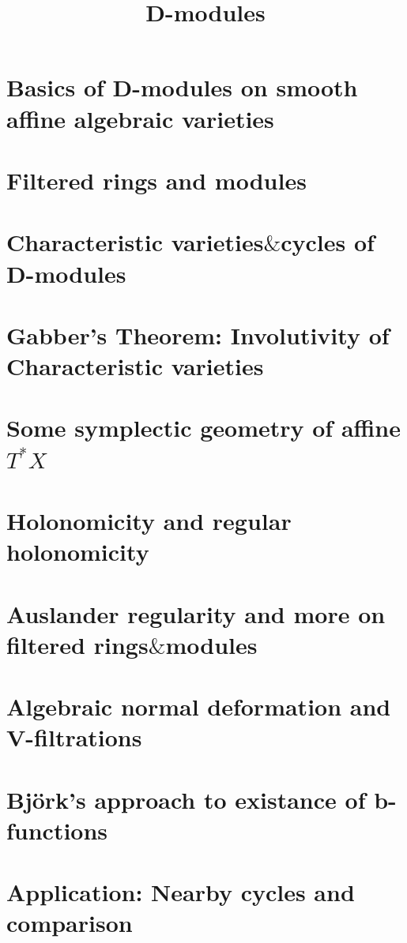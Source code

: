 \documentclass{book}
\title{D-modules}
\numberwithin{equation}{section}
\theoremstyle{thmdot}
\theoremstyle{defdot}
\begin{document}
\maketitle
\tableofcontents

\chapter{Basics of D-modules on smooth affine algebraic varieties}

\chapter{Filtered rings and modules}

\chapter{Characteristic varieties$\&$cycles of D-modules}

\chapter{Gabber's Theorem: Involutivity of Characteristic varieties}

\chapter{Some symplectic geometry of affine $T^{\ast}X$}

\chapter{Holonomicity and regular holonomicity}

\chapter{Auslander regularity and more on filtered rings$\&$modules}

\chapter{Algebraic normal deformation and V-filtrations}

\chapter{Bj\"ork's approach to existance of b-functions}

\chapter{Application: Nearby cycles and comparison}

\end{document}
